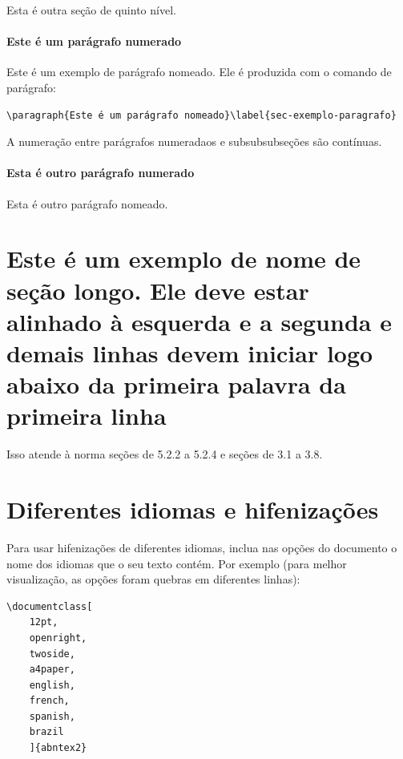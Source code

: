 Esta é outra seção de quinto nível.


\paragraph{Este é um parágrafo numerado}\label{sec-exemplo-paragrafo}

Este é um exemplo de parágrafo nomeado. Ele é produzida com o comando de
parágrafo:

\begin{verbatim}
\paragraph{Este é um parágrafo nomeado}\label{sec-exemplo-paragrafo}
\end{verbatim}

A numeração entre parágrafos numeradaos e subsubsubseções são contínuas.

\paragraph{Esta é outro parágrafo numerado}\label{sec-exemplo-paragrafo-outro}

Esta é outro parágrafo nomeado.

\section{Este é um exemplo de nome de seção longo. Ele deve estar
alinhado à esquerda e a segunda e demais linhas devem iniciar logo abaixo da
primeira palavra da primeira linha}

Isso atende à norma \cite{NBR14724:2011} seções de 5.2.2 a 5.2.4 
 e \cite{NBR6024:2012} seções de 3.1 a 3.8.

\section{Diferentes idiomas e hifenizações}
\label{sec-hifenizacao}

Para usar hifenizações de diferentes idiomas, inclua nas opções do documento o
nome dos idiomas que o seu texto contém. Por exemplo (para melhor
visualização, as opções foram quebras em diferentes linhas):

\begin{verbatim}
\documentclass[
	12pt,
	openright,
	twoside,
	a4paper,
	english,
	french,
	spanish,
	brazil
	]{abntex2}
\end{verbatim}

